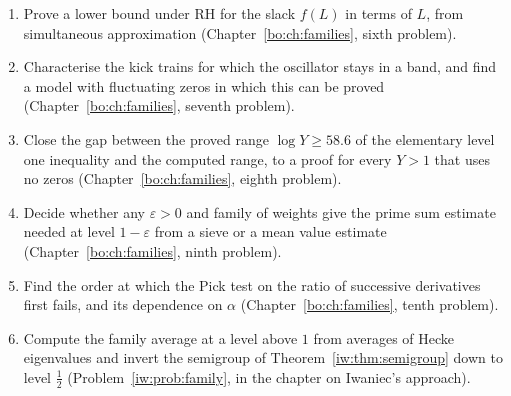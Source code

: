 \begin{enumerate}
\item Prove a lower bound under RH for the slack $f(L)$ in terms of $L$, from simultaneous approximation (Chapter~\ref{bo:ch:families}, sixth problem).
\item Characterise the kick trains for which the oscillator stays in a band, and find a model with fluctuating zeros in which this can be proved (Chapter~\ref{bo:ch:families}, seventh problem).
\item Close the gap between the proved range $\log Y\ge58.6$ of the elementary level one inequality and the computed range, to a proof for every $Y>1$ that uses no zeros (Chapter~\ref{bo:ch:families}, eighth problem).
\item Decide whether any $\varepsilon>0$ and family of weights give the prime sum estimate needed at level $1-\varepsilon$ from a sieve or a mean value estimate (Chapter~\ref{bo:ch:families}, ninth problem).
\item Find the order at which the Pick test on the ratio of successive derivatives first fails, and its dependence on $\alpha$ (Chapter~\ref{bo:ch:families}, tenth problem).
\item Compute the family average at a level above $1$ from averages of Hecke eigenvalues and invert the semigroup of Theorem~\ref{iw:thm:semigroup} down to level $\frac12$ (Problem~\ref{iw:prob:family}, in the chapter on Iwaniec's approach).
\end{enumerate}

